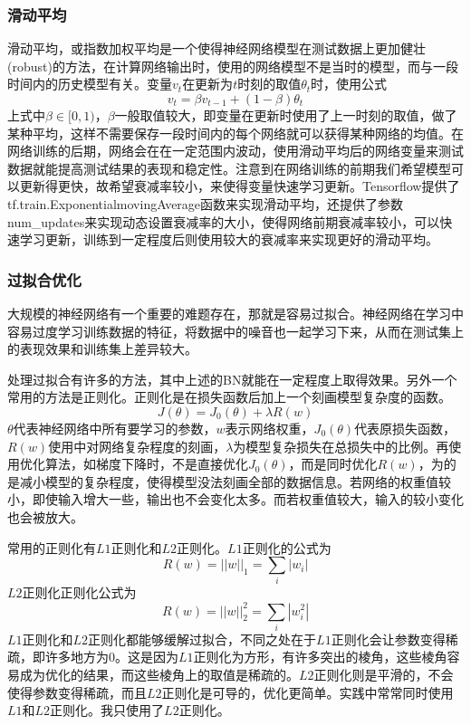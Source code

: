 \documentclass[12pt]{article}
\begin{document}
\subsubsection{滑动平均}
\noindent

滑动平均，或指数加权平均是一个使得神经网络模型在测试数据上更加健壮(robust)的方法，在计算网络输出时，使用的网络模型不是当时的模型，而与一段时间内的历史模型有关。变量$v_t$在更新为$t$时刻的取值$\theta_t$时，使用公式
$$v_t = \beta v_{t-1} + (1 - \beta) \theta_t$$
上式中$\beta \in [0, 1)$，$\beta$一般取值较大，即变量在更新时使用了上一时刻的取值，做了某种平均，这样不需要保存一段时间内的每个网络就可以获得某种网络的均值。在网络训练的后期，网络会在在一定范围内波动，使用滑动平均后的网络变量来测试数据就能提高测试结果的表现和稳定性。注意到在网络训练的前期我们希望模型可以更新得更快，故希望衰减率较小，来使得变量快速学习更新。Tensorflow提供了tf.train.ExponentialmovingAverage函数来实现滑动平均，还提供了参数num\_updates来实现动态设置衰减率的大小，使得网络前期衰减率较小，可以快速学习更新，训练到一定程度后则使用较大的衰减率来实现更好的滑动平均。

\subsubsection{过拟合优化}
\noindent

大规模的神经网络有一个重要的难题存在，那就是容易过拟合。神经网络在学习中容易过度学习训练数据的特征，将数据中的噪音也一起学习下来，从而在测试集上的表现效果和训练集上差异较大。

处理过拟合有许多的方法，其中上述的BN就能在一定程度上取得效果。另外一个常用的方法是正则化。正则化是在损失函数后加上一个刻画模型复杂度的函数。
$$J(\theta) = J_0(\theta) + \lambda R(w)$$
$\theta$代表神经网络中所有要学习的参数，$w$表示网络权重，$J_0(\theta)$代表原损失函数，$R(w)$使用中对网络复杂程度的刻画，$\lambda$为模型复杂损失在总损失中的比例。再使用优化算法，如梯度下降时，不是直接优化$J_0(\theta)$，而是同时优化$R(w)$，为的是减小模型的复杂程度，使得模型没法刻画全部的数据信息。若网络的权重值较小，即使输入增大一些，输出也不会变化太多。而若权重值较大，输入的较小变化也会被放大。

常用的正则化有$L1$正则化和$L2$正则化。$L1$正则化的公式为
$$R(w) = ||w||_1 = \sum_i|w_i|$$
$L2$正则化正则化公式为
$$R(w) = ||w||_2^2 = \sum_i|w_i^2|$$
$L1$正则化和$L2$正则化都能够缓解过拟合，不同之处在于$L1$正则化会让参数变得稀疏，即许多地方为0。这是因为$L1$正则化为方形，有许多突出的棱角，这些棱角容易成为优化的结果，而这些棱角上的取值是稀疏的。$L2$正则化则是平滑的，不会使得参数变得稀疏，而且$L2$正则化是可导的，优化更简单。实践中常常同时使用$L1$和$L2$正则化。我只使用了$L2$正则化。
\end{document}
